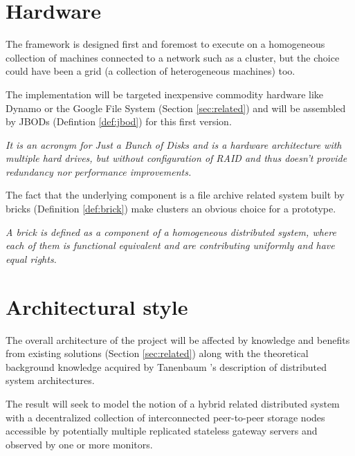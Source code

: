 \section{Hardware} \label{sec:hardware}
The framework is designed first and foremost to execute on a homogeneous collection of machines connected to a network such as a cluster, but the choice could have been a grid (a collection of heterogeneous machines) too. 
\newline

The implementation will be targeted inexpensive commodity hardware like Dynamo or the Google File System (Section \ref{sec:related}) and will be assembled by JBODs (Defintion \ref{def:jbod}) for this first version.

\vspace*{3mm}
\begin{definition}[JBOD] \label{def:jbod}
\textit{It is an acronym for Just a Bunch of Disks and is a hardware architecture with multiple hard drives, but without configuration of RAID and thus doesn't provide redundancy nor performance improvements.}
\end{definition}

The fact that the underlying component is a file archive related system built by bricks (Definition \ref{def:brick}) make clusters an obvious choice for a prototype.

\vspace*{3mm}
\begin{definition}[Brick] \label{def:brick}
\textit{A brick is defined as a component of a homogeneous distributed system, where each of them is functional equivalent and are contributing uniformly and have equal rights.}
\end{definition}
\vspace*{3mm}

\section{Architectural style} \label{sec:architectural-style}
The overall architecture of the project will be affected by knowledge and benefits from existing solutions (Section \ref{sec:related}) along with the theoretical background knowledge acquired by Tanenbaum \etal's description of distributed system architectures\cite{Tanenbaum:2006:DSP:1202502}. 
\newline

The result will seek to model the notion of a hybrid related distributed system with a decentralized collection of interconnected peer-to-peer storage nodes accessible by potentially multiple replicated stateless gateway servers and observed by one or more monitors.

